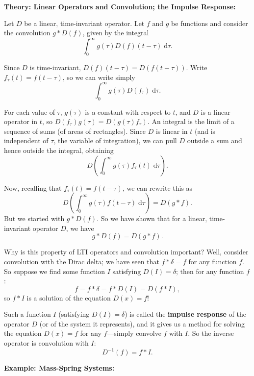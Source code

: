 \documentclass{article}
\newcommand{\diff}{\;\mathrm{d}}
\begin{document}
\clearpage











\textbf{Theory: Linear Operators and Convolution; the Impulse Response:}\bigskip


Let $D$ be a linear, time-invariant operator. Let $f$ and $g$ be functions and consider the convolution $g\ast D(f)$, given by the integral
\[\int_0^\infty g(\tau)D(f)(t-\tau)\diff \tau.\]

Since $D$ is time-invariant, $D(f)(t-\tau)=D(f(t-\tau))$. Write $f_\tau(t)=f(t-\tau)$, so we can write simply
\[\int_0^\infty g(\tau)D(f_\tau)\diff \tau.\]

For each value of $\tau$, $g(\tau)$ is a constant with respect to $t$, and $D$ is a linear operator in $t$, so $D(f_\tau)g(\tau)=D(g(\tau)f_\tau)$. An integral is the limit of a sequence of sums (of areas of rectangles). Since $D$ is linear in $t$ (and is independent of $\tau$, the variable of integration), we can pull $D$ outside a sum and hence outside the integral, obtaining
\[D\left(\int_0^\infty g(\tau)f_\tau(t)\diff \tau\right).\]

Now, recalling that $f_\tau(t)=f(t-\tau)$, we can rewrite this as
\[D\left(\int_0^\infty g(\tau)f(t-\tau)\diff \tau\right)=D(g\ast f).\]
But we started with $g\ast D(f)$. So we have shown that for a linear, time-invariant operator $D$, we have
\[g\ast D(f)=D(g\ast f).\]

\medskip

Why is this property of LTI operators and convolution important? Well, consider convolution with the Dirac delta; we have seen that $f\ast\delta=f$ for any function $f$. So suppose we find some function $I$ satisfying $D(I)=\delta$; then for any function $f$:
\[f=f\ast \delta = f\ast D(I)=D(f\ast I),\]
so $f\ast I$ is a solution of the equation $D(x)=f$!

Such a function $I$ (satisfying $D(I)=\delta$) is called the \textbf{impulse response} of the operator $D$ (or of the system it represents), and it gives us a method for solving the equation $D(x)=f$ for any $f$---simply convolve $f$ with $I$. So the inverse operator is convolution with $I$:
\[D^{-1}(f)=f\ast I.\]





\clearpage



\textbf{Example: Mass-Spring Systems:}\bigskip
\end{document}
